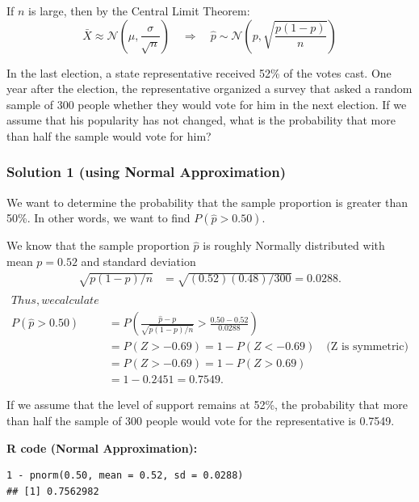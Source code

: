 If $n$ is large, then by the Central Limit Theorem:
\[
\bar{X} \approx \mathcal{N} \left( \mu, \frac{\sigma}{\sqrt{n}} \right)
\quad \Rightarrow \quad
\hat{p} \sim \mathcal{N} \left( p, \sqrt{\frac{p(1 - p)}{n}} \right)
\]
\begin{example}
In the last election, a state representative received 52\% of the votes cast. One year after the election, the representative organized a survey that asked a random sample of 300 people whether they would vote for him in the next election. If we assume that his popularity has not changed, what is the probability that more than half the sample would vote for him?


\vspace{1em}
\subsubsection*{Solution 1 (using Normal Approximation)}

We want to determine the probability that the sample proportion is greater than 50\%. In other words, we want to find $P(\hat{p} > 0.50)$.

We know that the sample proportion $\hat{p}$ is roughly Normally distributed with mean $p = 0.52$ and standard deviation
\begin{align*}
\sqrt{p(1 - p)/n} & =  \sqrt{(0.52)(0.48)/300} = 0.0288. \\
\end{align*}
\begin{align*}
Thus, we calculate \\
P(\hat{p} > 0.50) & = P\left( \frac{\hat{p} - p}{\sqrt{p(1-p)/n}} > \frac{0.50 - 0.52}{0.0288} \right) \\
&= P(Z > -0.69) = 1 - P(Z < -0.69) \quad \text{(Z is symmetric)} \\
&= P(Z > -0.69) = 1 - P(Z > 0.69) \\
&= 1 - 0.2451 = 0.7549.
\end{align*}

If we assume that the level of support remains at 52\%, the probability that more than half the sample of 300 people would vote for the representative is 0.7549.\par
\vspace{0.5em}
\noindent\textbf{R code (Normal Approximation):}
\begin{tcolorbox}[colback=gray!10, colframe=black!45, arc=2mm]
\begin{verbatim}
1 - pnorm(0.50, mean = 0.52, sd = 0.0288)
## [1] 0.7562982
\end{verbatim}
\end{tcolorbox}


\end{example}
